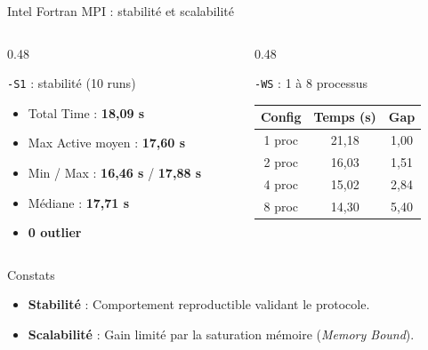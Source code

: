 \begin{frame}{Intel Fortran MPI : stabilité et scalabilité}
\footnotesize 

\begin{columns}[T,onlytextwidth]
    \begin{column}{0.48\textwidth}
        \begin{block}{\texttt{-S1} : stabilité (10 runs)}
            \begin{itemize}\setlength{\itemsep}{0pt} 
                \item Total Time : \textbf{18,09 s}
                \item Max Active moyen : \textbf{17,60 s}
                \item Min / Max : \textbf{16,46 s} / \textbf{17,88 s}
                \item Médiane : \textbf{17,71 s}
                \item \textbf{0 outlier}
            \end{itemize}
        \end{block}
    \end{column}

    \begin{column}{0.48\textwidth}
        \begin{block}{\texttt{-WS} : 1 à 8 processus}
            \centering
            \setlength{\tabcolsep}{4pt}
            \renewcommand{\arraystretch}{0.9} 
            \begin{tabular}{|c|c|c|}
                \hline
                \textbf{Config} & \textbf{Temps (s)} & \textbf{Gap} \\ \hline
                1 proc & 21,18 & 1,00 \\ \hline
                2 proc & 16,03 & 1,51 \\ \hline
                4 proc & 15,02 & 2,84 \\ \hline
                8 proc & 14,30 & 5,40 \\ \hline
            \end{tabular}
        \end{block}
    \end{column}
\end{columns}

\begin{block}{Constats}
    \begin{itemize}\setlength{\itemsep}{0pt}
        \item \textbf{Stabilité} : Comportement reproductible validant le protocole.
        \item \textbf{Scalabilité} : Gain limité par la saturation mémoire (\textit{Memory Bound}).
    \end{itemize}
\end{block}

\end{frame}

